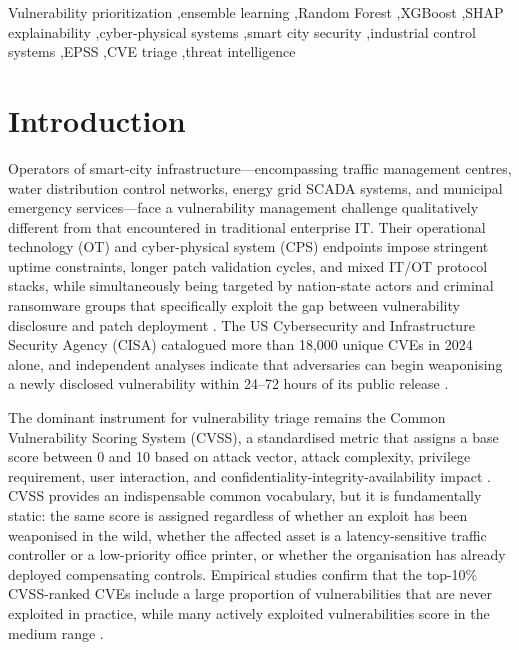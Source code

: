 \documentclass[review,12pt]{elsarticle}
\begin{document}
\begin{frontmatter}
\begin{keyword}
Vulnerability prioritization \sep ensemble learning \sep Random Forest \sep XGBoost \sep SHAP explainability \sep cyber-physical systems \sep smart city security \sep industrial control systems \sep EPSS \sep CVE triage \sep threat intelligence
\end{keyword}

\end{frontmatter}

\section{Introduction}
\label{sec:intro}

Operators of smart-city infrastructure---encompassing traffic management centres, water distribution control networks, energy grid SCADA systems, and municipal emergency services---face a vulnerability management challenge qualitatively different from that encountered in traditional enterprise IT. Their operational technology (OT) and cyber-physical system (CPS) endpoints impose stringent uptime constraints, longer patch validation cycles, and mixed IT/OT protocol stacks, while simultaneously being targeted by nation-state actors and criminal ransomware groups that specifically exploit the gap between vulnerability disclosure and patch deployment \citep{chen2024,wang2025}. The US Cybersecurity and Infrastructure Security Agency (CISA) catalogued more than 18,000 unique CVEs in 2024 alone, and independent analyses indicate that adversaries can begin weaponising a newly disclosed vulnerability within 24--72 hours of its public release \citep{jacobs2023,jiang2025}.

The dominant instrument for vulnerability triage remains the Common Vulnerability Scoring System (CVSS), a standardised metric that assigns a base score between 0 and 10 based on attack vector, attack complexity, privilege requirement, user interaction, and confidentiality-integrity-availability impact \citep{cvss}. CVSS provides an indispensable common vocabulary, but it is fundamentally static: the same score is assigned regardless of whether an exploit has been weaponised in the wild, whether the affected asset is a latency-sensitive traffic controller or a low-priority office printer, or whether the organisation has already deployed compensating controls. Empirical studies confirm that the top-10\% CVSS-ranked CVEs include a large proportion of vulnerabilities that are never exploited in practice, while many actively exploited vulnerabilities score in the medium range \citep{jacobs2023,bozorgi2010}.
\end{document}
